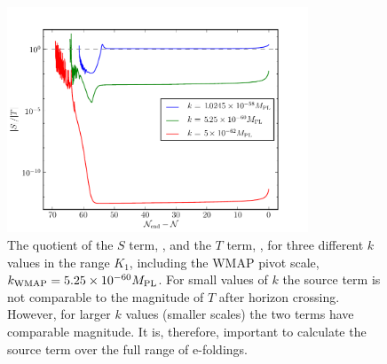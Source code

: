 \begin{figure}[htbp]
\centering
 \includegraphics[width=0.8\textwidth]{numerical/graphs/s-over-t-3ks-large}
\caption[Quotient of $S$ and $T$]{The quotient of the $S$ term,
, and the $T$ term, , for three
different $k$ values in the range $K_1$,
including the WMAP pivot scale, $k_\mathrm{WMAP}=5.25\times 10^{-60}M_{\mathrm{PL}}$.  
For small values of $k$ the source term is not comparable to the magnitude of $T$
after horizon crossing. However, for larger $k$ values (smaller scales) the two
terms have comparable magnitude.
It is, therefore,
important to calculate the source term over the full range of e-foldings.}
 \label{fig:s-over-t-3ks}
\end{figure}
% 
% 


